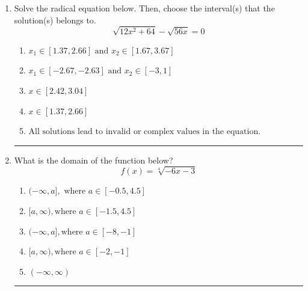 \documentclass[14pt]{extbook}
\newcommand{\litem}[1]{\item#1\hspace*{-1cm}\rule{\textwidth}{0.4pt}}
\begin{document}
\begin{enumerate}
\litem{
Solve the radical equation below. Then, choose the interval(s) that the solution(s) belongs to.\[ \sqrt{12 x^2 + 64} - \sqrt{56 x} = 0 \]\begin{enumerate}[label=\Alph*.]
\item \( x_1 \in [1.37, 2.66] \text{ and } x_2 \in [1.67,3.67] \)
\item \( x_1 \in [-2.67, -2.63] \text{ and } x_2 \in [-3,1] \)
\item \( x \in [2.42,3.04] \)
\item \( x \in [1.37,2.66] \)
\item \( \text{All solutions lead to invalid or complex values in the equation.} \)

\end{enumerate} }
\litem{
What is the domain of the function below?\[ f(x) = \sqrt[4]{-6 x - 3} \]\begin{enumerate}[label=\Alph*.]
\item \( (-\infty, a], \text{ where } a \in [-0.5, 4.5] \)
\item \( [a, \infty), \text{where } a \in [-1.5, 4.5] \)
\item \( (-\infty, a], \text{where } a \in [-8, -1] \)
\item \( [a, \infty), \text{where } a \in [-2, -1] \)
\item \( (-\infty, \infty) \)


\end{enumerate}}
\end{enumerate}
\end{document}
